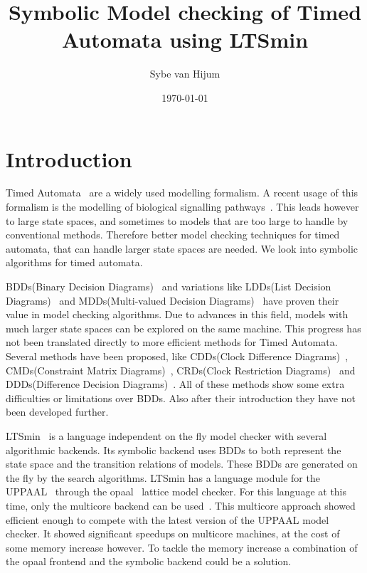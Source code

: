 \documentclass[11pt]{article}
\begin{document}
\newtheorem{mydef}{Definition}
\title{Symbolic Model checking of Timed Automata using LTSmin}
\author{Sybe van Hijum}
\date{\today}
\maketitle

\tableofcontents

\section{Introduction}
Timed Automata~\cite{Alur1994183} are a widely used modelling formalism. A recent usage of this formalism is the modelling of biological signalling pathways~\cite{DBLP:conf/bibe/SchivoSWCVKLPP12}. This leads however to large state spaces, and sometimes to models that are too large to handle by conventional methods. Therefore better model checking techniques for timed automata, that can handle larger state spaces are needed. We look into symbolic algorithms for timed automata.

BDDs(Binary Decision Diagrams)~\cite{?} and variations like LDDs(List Decision Diagrams)~\cite{so62465} and MDDs(Multi-valued Decision Diagrams)~\cite{129849} have proven their value in model checking algorithms. Due to advances in this field, models with much larger state spaces can be explored on the same machine. This progress has not been translated directly to more efficient methods for Timed Automata. Several methods have been proposed, like CDDs(Clock Difference Diagrams)~\cite{BRICS19491}, CMDs(Constraint Matrix Diagrams)~\cite{5702245}, CRDs(Clock Restriction Diagrams)~\cite{crds} and DDDs(Difference Decision Diagrams)~\cite{ddds, ddd-datastructure-99}. All of these methods show some extra difficulties or limitations over BDDs. Also after their introduction they have not been developed further.

LTSmin~\cite{eemcs18152,ltsmin-mc:nmf2011} is a language independent on the fly model checker with several algorithmic backends. Its symbolic backend uses BDDs to both represent the state space and the transition relations of models. These BDDs are generated on the fly by the search algorithms. LTSmin has a language module for the UPPAAL~\cite{UPPAAL} through the opaal~\cite{opaal} lattice model checker. For this language at this time, only the multicore backend can be used~\cite{eemcs21972}. This multicore approach showed efficient enough to compete with the latest version of the UPPAAL model checker. It showed significant speedups on multicore machines, at the cost of some memory increase however. To tackle the memory increase a combination of the opaal frontend and the symbolic backend could be a solution.
\end{document}
